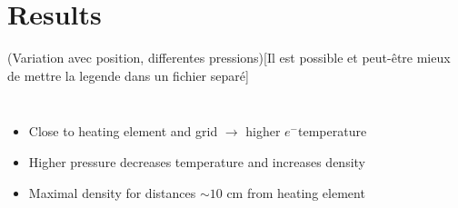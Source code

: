 \documentclass[10pt]{beamer}
\newcommand{\electron}[0]{$e^{-}$}
\begin{document}
\section{Results}
\begin{frame}{(Variation avec position, differentes pressions)}{[Il est possible et peut-être mieux de mettre la legende dans un fichier separé]}
    \begin{columns}[T]
        \centering
        \begin{itemize}
            \item Close to heating element and grid \(\rightarrow\) higher \electron temperature
            \item Higher pressure decreases temperature and increases density
            \item Maximal density for distances $\sim 10$ cm from heating element
        \end{itemize}

        \centering
    \end{columns}

\end{frame}
    
\end{document}
